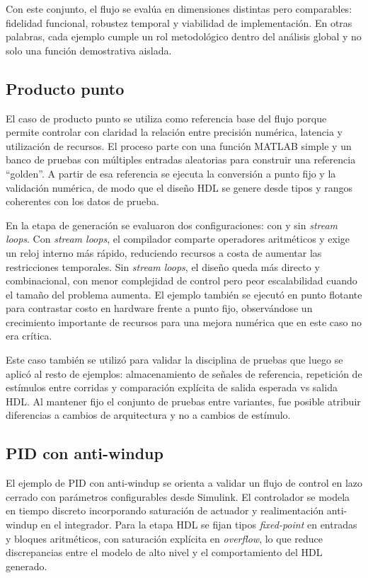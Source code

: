 Con este conjunto, el flujo se evalúa en dimensiones distintas pero comparables: fidelidad funcional, robustez temporal y viabilidad de implementación. En otras palabras, cada ejemplo cumple un rol metodológico dentro del análisis global y no solo una función demostrativa aislada.

\subsection{Producto punto}

El caso de producto punto se utiliza como referencia base del flujo porque permite controlar con claridad la relación entre precisión numérica, latencia y utilización de recursos. El proceso parte con una función MATLAB simple y un banco de pruebas con múltiples entradas aleatorias para construir una referencia ``golden''. A partir de esa referencia se ejecuta la conversión a punto fijo y la validación numérica, de modo que el diseño HDL se genere desde tipos y rangos coherentes con los datos de prueba.

En la etapa de generación se evaluaron dos configuraciones: con y sin \textit{stream loops}. Con \textit{stream loops}, el compilador comparte operadores aritméticos y exige un reloj interno más rápido, reduciendo recursos a costa de aumentar las restricciones temporales. Sin \textit{stream loops}, el diseño queda más directo y combinacional, con menor complejidad de control pero peor escalabilidad cuando el tamaño del problema aumenta. El ejemplo también se ejecutó en punto flotante para contrastar costo en hardware frente a punto fijo, observándose un crecimiento importante de recursos para una mejora numérica que en este caso no era crítica.

Este caso también se utilizó para validar la disciplina de pruebas que luego se aplicó al resto de ejemplos: almacenamiento de señales de referencia, repetición de estímulos entre corridas y comparación explícita de salida esperada vs salida HDL. Al mantener fijo el conjunto de pruebas entre variantes, fue posible atribuir diferencias a cambios de arquitectura y no a cambios de estímulo.

\subsection{PID con anti-windup}

El ejemplo de PID con anti-windup se orienta a validar un flujo de control en lazo cerrado con parámetros configurables desde Simulink. El controlador se modela en tiempo discreto incorporando saturación de actuador y realimentación anti-windup en el integrador. Para la etapa HDL se fijan tipos \textit{fixed-point} en entradas y bloques aritméticos, con saturación explícita en \textit{overflow}, lo que reduce discrepancias entre el modelo de alto nivel y el comportamiento del HDL generado.

